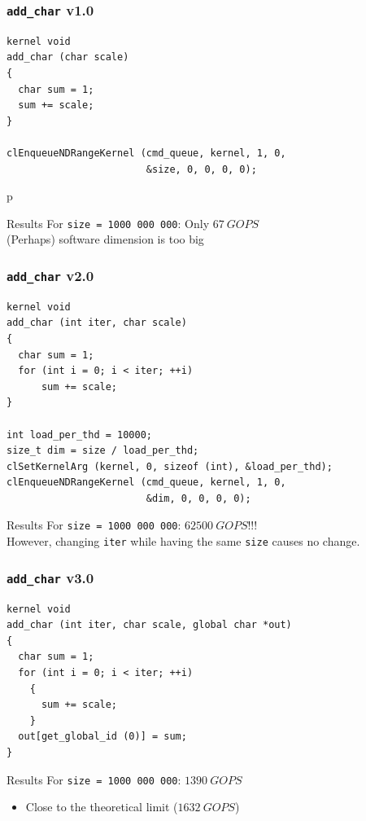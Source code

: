 \begin{frame}[fragile]
  \frametitle{\texttt{add\_char} v1.0}
\begin{lstlisting}[basicstyle=\footnotesize]
kernel void
add_char (char scale)
{
  char sum = 1;
  sum += scale;
}

clEnqueueNDRangeKernel (cmd_queue, kernel, 1, 0,
                        &size, 0, 0, 0, 0);
\end{lstlisting}
  \pause{}p
  \begin{alertblock}{Results}
    For \lstinline{size = 1000 000 000}: \pause{}\alert{Only}
    \(67~\mathit{GOPS}\) \\
    \pause{} (Perhaps) software dimension is too big
  \end{alertblock}
\end{frame}

\begin{frame}[fragile]
  \frametitle{\texttt{add\_char} v2.0}
\begin{lstlisting}[basicstyle=\footnotesize]
kernel void
add_char (int iter, char scale)
{
  char sum = 1;
  for (int i = 0; i < iter; ++i)
      sum += scale;
}

int load_per_thd = 10000;
size_t dim = size / load_per_thd;
clSetKernelArg (kernel, 0, sizeof (int), &load_per_thd);
clEnqueueNDRangeKernel (cmd_queue, kernel, 1, 0,
                        &dim, 0, 0, 0, 0);
\end{lstlisting}
  \pause{}
  \begin{alertblock}{Results}
    For \lstinline{size = 1000 000 000}:
    \pause{}\(62500~\mathit{GOPS}\)!!! \\
    \pause{} However, changing \lstinline{iter} while having the same
    \lstinline{size} causes no change.
  \end{alertblock}
\end{frame}

\begin{frame}[fragile]
  \frametitle{\texttt{add\_char} v3.0}
  \pause{}
\begin{lstlisting}[basicstyle=\footnotesize]
kernel void
add_char (int iter, char scale, global char *out)
{
  char sum = 1;
  for (int i = 0; i < iter; ++i)
    {
      sum += scale;
    }
  out[get_global_id (0)] = sum;
}
\end{lstlisting}
  \begin{alertblock}{Results}
    For \lstinline{size = 1000 000 000}:
    \pause{}\(1390~\mathit{GOPS}\) \pause{}
    \begin{itemize}
    \item Close to the theoretical limit (\(1632~\mathit{GOPS}\))
    \end{itemize}
  \end{alertblock}
\end{frame}

